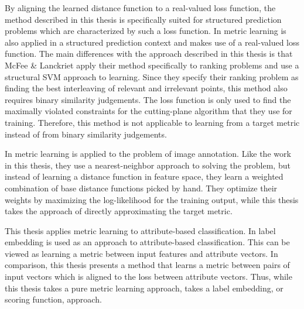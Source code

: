 By aligning the learned distance function to a real-valued loss function, the method described in this thesis is specifically suited for structured prediction problems which are characterized by such a loss function. In\cite{mcfee2010metric} metric learning is also applied in a structured prediction context and makes use of a real-valued loss function. The main differences with the approach described in this thesis is that McFee \& Lanckriet apply their method specifically to ranking problems and use a structural \ac{SVM} approach to learning. Since they specify their ranking problem as finding the best interleaving of relevant and irrelevant points, this method also requires binary similarity judgements. The loss function is only used to find the maximally violated constraints for the cutting-plane algorithm that they use for training. Therefore, this method is not applicable to learning from a target metric instead of from binary similarity judgements. 


In \cite{guillaumin2009tagprop} metric learning is applied to the problem of image annotation. Like the work in this thesis, they use a nearest-neighbor approach to solving the problem, but instead of learning a distance function in feature space, they learn a weighted combination of base distance functions picked by hand. They optimize their weights by maximizing the log-likelihood for the training output, while this thesis takes the approach of directly approximating the target metric.

This thesis applies metric learning to attribute-based classification. In \cite{akata2013label} label embedding is used as an approach to attribute-based classification. This can be viewed as learning a metric between input features and attribute vectors. In comparison, this thesis presents a method that learns a metric between pairs of input vectors which is aligned to the loss between attribute vectors. Thus, while this thesis takes a pure metric learning approach, \cite{akata2013label} takes a label embedding, or scoring function, approach.

